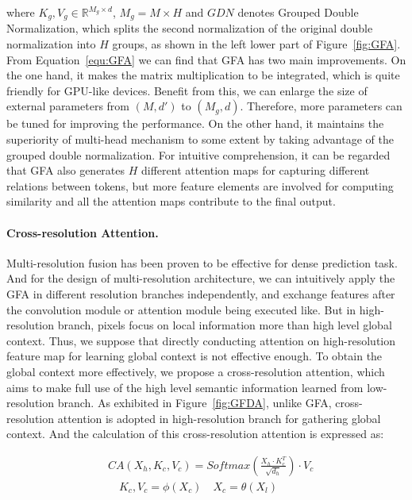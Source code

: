 \documentclass{article}
\begin{document}
where $K_g, V_g \in \mathbb{R}^{M_g\times d}$, $M_g = M\times H$ and $GDN$ denotes Grouped Double Normalization, which splits the second normalization of the original double normalization into $H$ groups, as shown in the left lower part of Figure~\ref{fig:GFA}. From Equation~\ref{equ:GFA} we can find that GFA has two main improvements. On the one hand, it makes the matrix multiplication to be integrated, which is quite friendly for GPU-like devices. Benefit from this, we can enlarge the size of external parameters from $(M, d')$ to $(M_g, d)$. Therefore, more parameters can be tuned for improving the performance. On the other hand, it maintains the superiority of multi-head mechanism to some extent by taking advantage of the grouped double normalization. For intuitive comprehension, it can be regarded that GFA also generates $H$ different attention maps for capturing different relations between tokens, but more feature elements are involved for computing similarity and all the attention maps contribute to the final output.

\vspace{-2mm}
\paragraph{Cross-resolution Attention.}

Multi-resolution fusion has been proven to be effective for dense prediction task. And for the design of multi-resolution architecture, we can intuitively apply the GFA in different resolution branches independently, and exchange features after the convolution module or attention module being executed like\cite{wang2020deep, yuan2021hrformer}. But in high-resolution branch, pixels focus on local information more than high level global context. Thus, we suppose that directly conducting attention on high-resolution feature map for learning global context is not effective enough. To obtain the global context more effectively, we propose a cross-resolution attention, which aims to make full use of the high level semantic information learned from low-resolution branch. As exhibited in Figure~\ref{fig:GFDA}, unlike GFA, cross-resolution attention is adopted in high-resolution branch for gathering global context. And the calculation of this cross-resolution attention is expressed as:

\begin{equation}
    \begin{aligned}
&CA(X_h, K_c, V_c) = Softmax(\frac{X_h\cdot K_c^T}{\sqrt{d_h}})\cdot V_c\\
        &\quad K_c, V_c = \phi(X_c)\quad X_c = \theta(X_l)
    \end{aligned}
    \label{equ:CA}
\end{equation}
\end{document}
